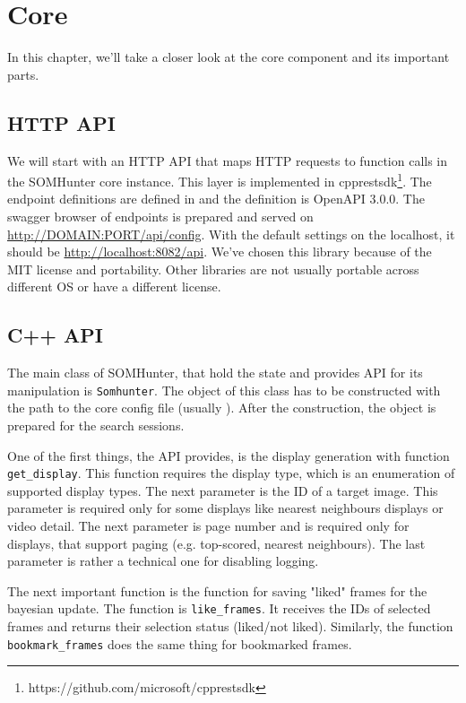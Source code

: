 \chapter{Core}
\label{comp-core}

In this chapter, we'll take a closer look at the core component and its important parts.

\section{HTTP API}

We will start with an HTTP API that maps HTTP requests to function calls in the SOMHunter core instance. This layer is implemented in cpprestsdk\footnote{https://github.com/microsoft/cpprestsdk}. The endpoint definitions are defined in  and the definition is OpenAPI 3.0.0. The swagger browser of endpoints is prepared and served on \url{http://DOMAIN:PORT/api/config}. With the default settings on the localhost, it should be \url{http://localhost:8082/api}. We've chosen this library because of the MIT license and portability. Other libraries are not usually portable across different OS or have a different license.

\section{C++ API}

The main class of SOMHunter, that hold the state and provides API for its manipulation is \lstinline{Somhunter}. The object of this class has to be constructed with the path to the core config file (usually ). After the construction, the object is prepared for the search sessions. 

One of the first things, the API provides, is the display generation with function \lstinline{get_display}. This function requires the display type, which is an enumeration of supported display types. The next parameter is the ID of a target image. This parameter is required only for some displays like nearest neighbours displays or video detail. The next parameter is page number and is required only for displays, that support paging (e.g. top-scored, nearest neighbours). The last parameter is rather a technical one for disabling logging. 

The next important function is the function for saving "liked" frames for the bayesian update. The function is \lstinline{like_frames}. It receives the IDs of selected frames and returns their selection status (liked/not liked). Similarly, the function \lstinline{bookmark_frames} does the same thing for bookmarked frames. 

